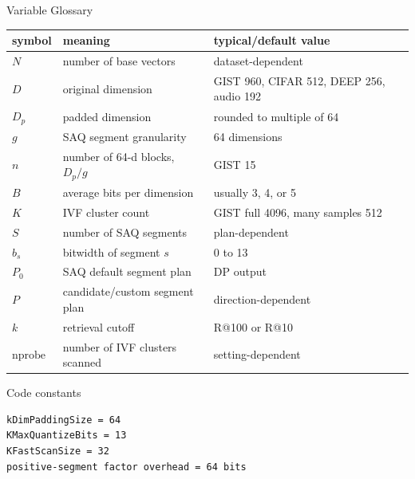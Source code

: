 \documentclass[aspectratio=169,10pt]{beamer}
\begin{document}
\begin{frame}[fragile]{Variable Glossary}
\scriptsize
\begin{tabularx}{\textwidth}{lXl}
\toprule
symbol & meaning & typical/default value \\
\midrule
\(N\) & number of base vectors & dataset-dependent \\
\(D\) & original dimension & GIST 960, CIFAR 512, DEEP 256, audio 192 \\
\(D_p\) & padded dimension & rounded to multiple of 64 \\
\(g\) & SAQ segment granularity & 64 dimensions \\
\(n\) & number of 64-d blocks, \(D_p/g\) & GIST 15 \\
\(B\) & average bits per dimension & usually 3, 4, or 5 \\
\(K\) & IVF cluster count & GIST full 4096, many samples 512 \\
\(S\) & number of SAQ segments & plan-dependent \\
\(b_s\) & bitwidth of segment \(s\) & 0 to 13 \\
\(P_0\) & SAQ default segment plan & DP output \\
\(P\) & candidate/custom segment plan & direction-dependent \\
\(k\) & retrieval cutoff & R@100 or R@10 \\
\(\text{nprobe}\) & number of IVF clusters scanned & setting-dependent \\
\bottomrule
\end{tabularx}

\vspace{0.8em}
\begin{block}{Code constants}
\begin{lstlisting}
kDimPaddingSize = 64
KMaxQuantizeBits = 13
KFastScanSize = 32
positive-segment factor overhead = 64 bits
\end{lstlisting}
\end{block}
\end{frame}
\end{document}
